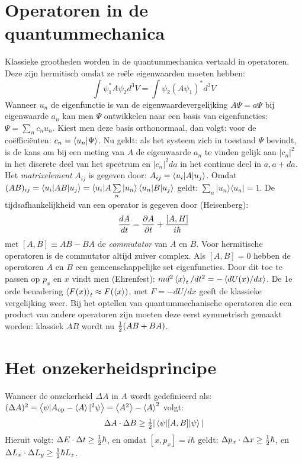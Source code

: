 \section[~~Operatoren in de quantummechanica]{Operatoren in de quantummechanica}
Klassieke grootheden worden in de quantummechanica vertaald in operatoren.
Deze zijn hermitisch omdat ze re\"ele eigenwaarden moeten hebben:
\[
\int\psi_1^*A\psi_2d^3V=\int\psi_2(A\psi_1)^*d^3V
\]
Wanneer $u_n$ de eigenfunctie is van de eigenwaardevergelijking
$A\Psi=a\Psi$ bij eigenwaarde $a_n$ kan men $\Psi$ ontwikkelen naar een
basis van eigenfuncties: $\Psi=\sum\limits_nc_nu_n$. Kiest men deze basis
orthonormaal, dan volgt: voor de co\"effici\"enten: $c_n=\left\langle u_n|\Psi \right\rangle$. Nu
geldt: als het systeem zich in toestand $\Psi$ bevindt, is de kans om bij een
meting van $A$ de eigenwaarde $a_n$ te vinden gelijk aan $|c_n|^2$ in het
discrete deel van het spectrum en $|c_n|^2da$ in het continue deel in
$a,a+da$. Het {\it matrixelement} $A_{ij}$ is gegeven door:
$A_{ij}=\left\langle u_i|A|u_j \right\rangle$. Omdat
$(AB)_{ij}=\left\langle u_i|AB|u_j \right\rangle=\langle u_i|A\sum\limits_n|u_n\rangle\left\langle u_n|B|u_j \right\rangle$
geldt: $\sum\limits_n|u_n\rangle\langle u_n|=1$.
\npar
De tijdsafhankelijkheid van een operator is gegeven door (Heisenberg):
\[
\frac{dA}{dt}=\frac{\partial A}{\partial t}+\frac{[A,H]}{i\hbar}
\]
met $[A,B]\equiv AB-BA$ de {\it commutator} van $A$ en $B$. Voor hermitische
operatoren is de commutator altijd zuiver complex. Als $[A,B]=0$ hebben
de operatoren $A$ en $B$ een gemeenschappelijke set eigenfuncties. Door dit
toe te passen op $p_x$ en $x$ vindt men (Ehrenfest):
$md^2\left\langle x \right\rangle_t/dt^2=-\left\langle dU(x)/dx \right\rangle$.
\npar
De 1e orde benadering $\left\langle F(x) \right\rangle_t\approx F(\left\langle x \right\rangle)$, met $F=-dU/dx$ geeft de
klassieke vergelijking weer.
\npar
Bij het optellen van quantummechanische operatoren die een product van andere
operatoren zijn moeten deze eerst symmetrisch gemaakt worden: klassiek $AB$
wordt nu $\mbox{$\frac{1}{2}$}(AB+BA)$.

\section[~~Het onzekerheidsprincipe]{Het onzekerheidsprincipe}
Wanneer de onzekerheid $\Delta A$ in $A$ wordt gedefinieerd als:
$(\Delta A)^2=\left\langle \psi|A_{\rm op}-\left\langle A \right\rangle|^2\psi \right\rangle=\left\langle A^2 \right\rangle-\left\langle A \right\rangle^2$ volgt:
\[
\Delta A\cdot\Delta B\geq\mbox{$\frac{1}{2}$}|\left\langle \psi|[A,B]|\psi \right\rangle|
\]
Hieruit volgt: $\Delta E\cdot\Delta t\geq\mbox{$\frac{1}{2}$}\hbar$, en omdat
$[x,p_x]=i\hbar$ geldt: $\Delta p_x\cdot\Delta x\geq\mbox{$\frac{1}{2}$}\hbar$, en
$\Delta L_x\cdot\Delta L_y\geq\mbox{$\frac{1}{2}$}\hbar L_z$.

